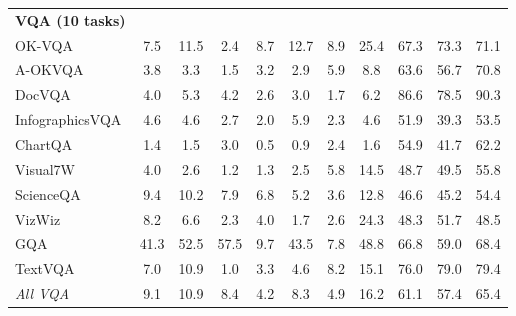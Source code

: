 \documentclass[11pt]{article}
\begin{document}
\begin{table}[]
{\begin{tabular}{lcccccccccc}
\rowcolor{blue!15} \textbf{VQA (10 tasks)} & & & & & & & & & &\\
OK-VQA               & 7.5  & 11.5 & 2.4  & 8.7  & 12.7 & 8.9 & 25.4 & 67.3 & 73.3 & 71.1\\
A-OKVQA              & 3.8  & 3.3  & 1.5  & 3.2  & 2.9  & 5.9 & 8.8 & 63.6 & 56.7 & 70.8\\
DocVQA               & 4.0  & 5.3  & 4.2  & 2.6  & 3.0  & 1.7 & 6.2 & 86.6 & 78.5 & 90.3\\
InfographicsVQA      & 4.6  & 4.6  & 2.7  & 2.0  & 5.9  & 2.3 & 4.6 & 51.9 & 39.3 & 53.5\\
ChartQA              & 1.4  & 1.5  & 3.0  & 0.5  & 0.9  & 2.4 & 1.6 & 54.9 & 41.7 & 62.2\\
Visual7W             & 4.0  & 2.6  & 1.2  & 1.3  & 2.5  & 5.8 & 14.5 & 48.7 & 49.5 & 55.8\\
\rowcolor{yellow!10} ScienceQA  & 9.4  & 10.2 & 7.9  & 6.8  & 5.2  & 3.6 & 12.8 & 46.6 & 45.2 & 54.4\\
\rowcolor{yellow!10} VizWiz    & 8.2  & 6.6  & 2.3  & 4.0  & 1.7  & 2.6  & 24.3 & 48.3 & 51.7 & 48.5\\
\rowcolor{yellow!10} GQA        & 41.3 & 52.5 & 57.5 & 9.7  & 43.5 & 7.8 & 48.8 & 66.8 & 59.0 & 68.4\\
\rowcolor{yellow!10} TextVQA    & 7.0  & 10.9 & 1.0  & 3.3  & 4.6  & 8.2 & 15.1 & 76.0 & 79.0 & 79.4\\
\textit{All VQA}      & 9.1  & 10.9 & 8.4  & 4.2  & 8.3  & 4.9 & 16.2 & 61.1 & 57.4 & 65.4\\
\midrule


\end{tabular}}
\end{table}
\end{document}
